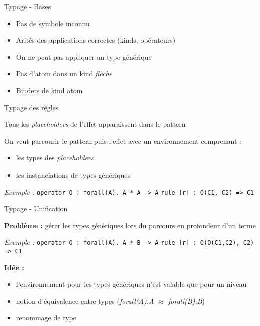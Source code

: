 \begin{frame}{Typage - Bases}

\begin{itemize}
\item Pas de symbole inconnu
\smallskip
\item Arités des applications correctes (kinds, opérateurs)
\smallskip
\item On ne peut pas appliquer un type générique
\smallskip
\item Pas d'atom dans un kind \emph{flèche} %
\smallskip
\item Binders de kind atom
\end{itemize}

\end{frame}

\begin{frame}{Typage des règles}

Tous les \emph{placeholders} de l'effet apparaissent dans le pattern
\medskip

On veut parcourir le pattern puis l'effet avec un environnement comprenant :
\smallskip

\begin{itemize}
\item les types des \emph{placeholders}
\item les instanciations de types génériques
\end{itemize}
\bigskip

\textit{Exemple :}
\linebreak
\texttt{operator O : forall(A). A * A -> A}
\linebreak
\texttt{rule [r] : O(C1, C2) => C1}

\end{frame}

\begin{frame}{Typage - Unification}

\textbf{Problème :} gérer les types génériques lors du parcours en profondeur d'un terme
\medskip

\textit{Exemple :}\linebreak
\texttt{operator O : forall(A). A * B -> A}\linebreak
\texttt{rule [r] : O(O(C1,C2), C2) => C1}%
\medskip

\textbf{Idée :} 
\begin{itemize}
\item l'environnement pour les types génériques n'est valable que pour un niveau
\item notion d'équivalence entre types (\textit{forall(A).A $\approx$ forall(B).B})
\item renommage de type
\end{itemize}

\end{frame}
